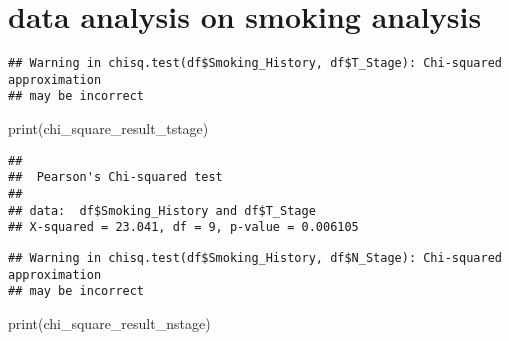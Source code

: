 \documentclass[
]{article}
\newenvironment{Shaded}{\begin{snugshade}}{\end{snugshade}}
\newcommand{\CommentTok}[1]{\textcolor[rgb]{0.56,0.35,0.01}{\textit{#1}}}
\newcommand{\FunctionTok}[1]{\textcolor[rgb]{0.00,0.00,0.00}{#1}}
\newcommand{\NormalTok}[1]{#1}
\newcommand{\OtherTok}[1]{\textcolor[rgb]{0.56,0.35,0.01}{#1}}
\newcommand{\SpecialCharTok}[1]{\textcolor[rgb]{0.00,0.00,0.00}{#1}}
\begin{document}
\hypertarget{data-analysis-on-smoking-analysis}{%
\section{data analysis on smoking
analysis}\label{data-analysis-on-smoking-analysis}}

\begin{Shaded}
\end{Shaded}

\begin{verbatim}
## Warning in chisq.test(df$Smoking_History, df$T_Stage): Chi-squared approximation
## may be incorrect
\end{verbatim}

\begin{Shaded}
\begin{Highlighting}[]
\FunctionTok{print}\NormalTok{(chi\_square\_result\_tstage)}
\end{Highlighting}
\end{Shaded}

\begin{verbatim}
## 
##  Pearson's Chi-squared test
## 
## data:  df$Smoking_History and df$T_Stage
## X-squared = 23.041, df = 9, p-value = 0.006105
\end{verbatim}

\begin{Shaded}
\end{Shaded}

\begin{verbatim}
## Warning in chisq.test(df$Smoking_History, df$N_Stage): Chi-squared approximation
## may be incorrect
\end{verbatim}

\begin{Shaded}
\begin{Highlighting}[]
\FunctionTok{print}\NormalTok{(chi\_square\_result\_nstage)}
\end{Highlighting}
\end{Shaded}
\end{document}
